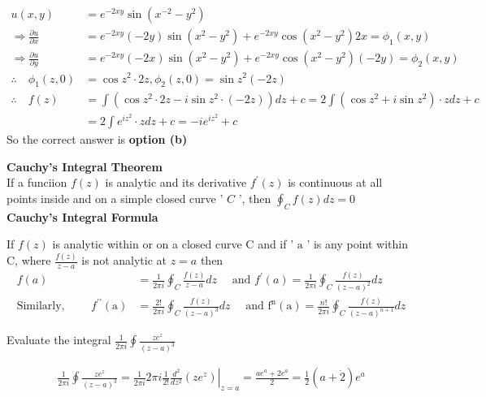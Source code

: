 	\begin{answer}
		\begin{align*}
		u(x, y)&=e^{-2 x y} \sin \left(x^{-2}-y^{2}\right) \\
		\Rightarrow \frac{\partial u}{\partial x}&=e^{-2 x y}(-2 y) \sin \left(x^{2}-y^{2}\right)+e^{-2 x y} \cos \left(x^{2}-y^{2}\right) 2 x=\phi_{1}(x, y) \\
		\Rightarrow \frac{\partial u}{\partial y}&=e^{-2 x y}(-2 x) \sin \left(x^{2}-y^{2}\right)+e^{-2 x y} \cos \left(x^{2}-y^{2}\right)(-2 y)=\phi_{2}(x, y)\\
		\therefore \quad \phi_{1}(z, 0) &=\cos z^{2} \cdot 2 z, \phi_{2}(z, 0)=\sin z^{2}(-2 z) \\
		\therefore \quad f(z) &=\int\left(\cos z^{2} \cdot 2 z-i \sin z^{2} \cdot(-2 z)\right) d z+c=2 \int\left(\cos z^{2}+i \sin z^{2}\right) \cdot z d z+c \\
		&=2 \int e^{i z^{2}} \cdot z d z+c=-i e^{i z^{2}}+c
		\end{align*}
		So the correct answer is \textbf{option (b)}
	\end{answer}
\textbf{Cauchy's Integral Theorem}\\
If a funciion $f(z)$ is analytic and its derivative $f^{\prime}(z)$ is continuous at all points inside and on a simple closed curve ' $C$ ', then $\oint_{C} f(z) d z=0$\\
\textbf{Cauchy's Integral Formula}\\
\begin{answer}
	If $f(z)$ is analytic within or on a closed curve $\mathrm{C}$ and if ' $\mathrm{a}$ ' is any point within ${\mathrm{C}}$, where $\frac{f(z)}{z-a}$ is not analytic at $z=a$ then
	\begin{align*}
	f(a)&=\frac{1}{2 \pi i} \oint_{C} \frac{f(z)}{z-a} d z \quad \text { and } f^{\prime}(a)=\frac{1}{2 \pi i} \oint_{C} \frac{f(z)}{(z-a)^{2}} d z\\
	\text{Similarly, }\qquad f^{\prime \prime}(\mathrm{a})&=\frac{2 !}{2 \pi i} \oint_{C} \frac{f(z)}{(z-a)^{3}} d z \quad\text{ and } \mathrm{f}^{\mathrm{n}}(\mathrm{a})=\frac{n !}{2 \pi i} \oint_{C} \frac{f(z)}{(z-a)^{n+1}} d z
	\end{align*}
\end{answer}
\begin{exercise}
	Evaluate the integral $\frac{1}{2 \pi i} \oint \frac{z e^{z}}{(z-a)^{3}}$
\end{exercise}
\begin{answer}
	\begin{align*}
	\frac{1}{2 \pi i} \oint \frac{z e^{z}}{(z-a)^{3}}=\left.\frac{1}{2 \pi i} 2 \pi i \frac{1}{2 !} \frac{d^{2}}{d z^{2}}\left(z e^{z}\right)\right|_{z=a}=\frac{a e^{a}+2 e^{a}}{2}=\frac{1}{2}(a+\dot{2}) e^{a}
	\end{align*}
\end{answer}
